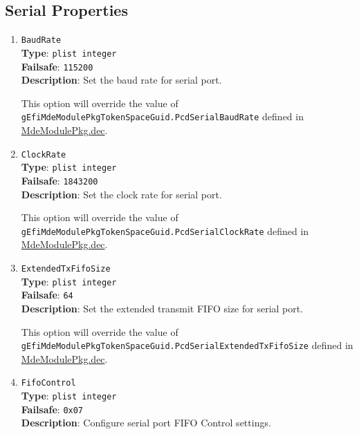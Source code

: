 \documentclass[]{article}
\begin{document}
\subsection{Serial Properties}\label{miscserialprops}

\begin{enumerate}
\item
  \texttt{BaudRate}\\
  \textbf{Type}: \texttt{plist\ integer}\\
  \textbf{Failsafe}: \texttt{115200}\\
  \textbf{Description}: Set the baud rate for serial port.

  This option will override the value of \texttt{gEfiMdeModulePkgTokenSpaceGuid.PcdSerialBaudRate}
  defined in \href{https://github.com/acidanthera/audk/blob/master/MdeModulePkg/MdeModulePkg.dec}{MdeModulePkg.dec}.

\item
  \texttt{ClockRate}\\
  \textbf{Type}: \texttt{plist\ integer}\\
  \textbf{Failsafe}: \texttt{1843200}\\
  \textbf{Description}: Set the clock rate for serial port.

  This option will override the value of \texttt{gEfiMdeModulePkgTokenSpaceGuid.PcdSerialClockRate}
  defined in \href{https://github.com/acidanthera/audk/blob/master/MdeModulePkg/MdeModulePkg.dec}{MdeModulePkg.dec}.

\item
  \texttt{ExtendedTxFifoSize}\\
  \textbf{Type}: \texttt{plist\ integer}\\
  \textbf{Failsafe}: \texttt{64}\\
  \textbf{Description}: Set the extended transmit FIFO size for serial port.

  This option will override the value of \texttt{gEfiMdeModulePkgTokenSpaceGuid.PcdSerialExtendedTxFifoSize}
  defined in \href{https://github.com/acidanthera/audk/blob/master/MdeModulePkg/MdeModulePkg.dec}{MdeModulePkg.dec}.

\item
  \texttt{FifoControl}\\
  \textbf{Type}: \texttt{plist\ integer}\\
  \textbf{Failsafe}: \texttt{0x07}\\
  \textbf{Description}: Configure serial port FIFO Control settings.


\end{enumerate}
\end{document}
